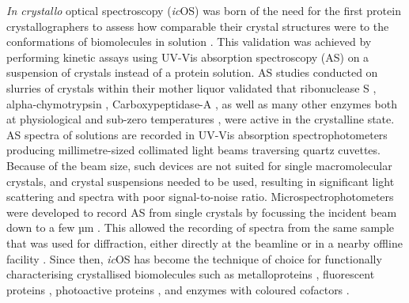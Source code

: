 \textit{In crystallo} optical spectroscopy (\textit{ic}OS) was born of the need for the first protein crystallographers to assess how comparable their crystal structures were to the conformations of biomolecules in solution \parencite{mozzarelliProteinFunctionCrystal1996}. This validation was achieved by performing kinetic assays using UV-Vis absorption spectroscopy (AS) on a suspension of crystals instead of a protein solution. AS studies conducted on slurries of crystals within their mother liquor validated that ribonuclease S \parencite{doscherActivityEnzymeCrystalline1963}, alpha-chymotrypsin \parencite{kallosCatalyticActivityChymotrypsin1964}, Carboxypeptidase-A \parencite{quiochoEnzymicBehaviorCarboxypeptidaseA1966}, as well as many other enzymes both at physiological and sub-zero temperatures \parencite{finkFormationStableCrystalline1976,makinenReactivityCryoenzymologyEnzymes1977}, were active in the crystalline state. AS spectra of solutions are recorded in UV-Vis absorption spectrophotometers producing millimetre-sized collimated light beams traversing quartz cuvettes. Because of the beam size, such devices are not suited for single macromolecular crystals, and crystal suspensions needed to be used, resulting in significant light scattering and spectra with poor signal-to-noise ratio. Microspectrophotometers were developed to record AS from single crystals by focussing the incident beam down to a few µm \parencite{hadfieldFastPortableMicrospectrophotometer1993}. This allowed the recording of spectra from the same sample that was used for diffraction, either directly at the beamline or in a nearby offline facility \parencite{pearsonMicrospectrophotometryStructuralEnzymology2004}. Since then, \textit{ic}OS has become the technique of choice for functionally characterising crystallised biomolecules such as metalloproteins \parencite{berglundCatalyticPathwayHorseradish2002,roseSpectroscopicallyValidatedPHdependent2024}, fluorescent proteins \parencite{royantAdvancesSpectroscopicMethods2007,dezitterMechanisticInvestigationsGreen2020}, photoactive proteins \parencite{edmanHighresolutionXrayStructure1999,kovalevMechanismsInwardTransmembrane2023}, and enzymes with coloured cofactors \parencite{orruSnapshotsEnzymaticBaeyerVilliger2011,safariTimeresolvedSerialCrystallography2023}. 

